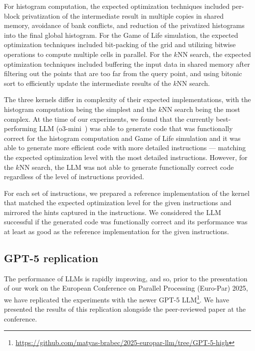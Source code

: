 For histogram computation, the expected optimization techniques included per-block privatization of the intermediate result in multiple copies in shared memory, avoidance of bank conflicts, and reduction of the privatized histograms into the final global histogram. For the Game of Life simulation, the expected optimization techniques included bit-packing of the grid and utilizing bitwise operations to compute multiple cells in parallel. For the $k$NN search, the expected optimization techniques included buffering the input data in shared memory after filtering out the points that are too far from the query point, and using bitonic sort to efficiently update the intermediate results of the $k$NN search.

The three kernels differ in complexity of their expected implementations, with the histogram computation being the simplest and the $k$NN search being the most complex.
At the time of our experiments, we found that the currently best-performing LLM (o3-mini~\cite{openai2025o3mini}) was able to generate code that was functionally correct for the histogram computation and Game of Life simulation and it was able to generate more efficient code with more detailed instructions --- matching the expected optimization level with the most detailed instructions. However, for the $k$NN search, the LLM was not able to generate functionally correct code regardless of the level of instructions provided.

For each set of instructions, we prepared a reference implementation of the kernel that matched the expected optimization level for the given instructions and mirrored the hints captured in the instructions. We considered the LLM successful if the generated code was functionally correct and its performance was at least as good as the reference implementation for the given instructions.


\subsection{GPT-5 replication}\label{sec:gpt5-replication}

The performance of LLMs is rapidly improving, and so, prior to the presentation of our work on the European Conference on Parallel Processing (Euro-Par) 2025, we have replicated the experiments with the newer GPT-5 LLM\footnote{\url{https://github.com/matyas-brabec/2025-europar-llm/tree/GPT-5-high}}. We have presented the results of this replication alongside the peer-reviewed paper at the conference.


